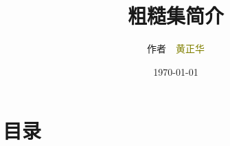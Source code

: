 \documentclass[notheorems,mathserif,table]{beamer}
\begin{document}
\newtheorem{theorem}{定理}
\newtheorem{definition}{定义}
\newtheorem{lemma}{引理}
\newtheorem{corollary}{推论}
\newtheorem{proposition}{性质}
\newtheorem{example}{例}
\newtheorem{remark}{注}

\renewcommand\figurename{\rm 图}
\renewcommand\tablename{\bf 表}
    \title{\heiti 粗糙集简介}
    \author[\textcolor{white}{\songti 作者~黄正华}]{\songti 作者~~\textcolor{olive}{黄正华}}
    \date{\today}
    \frame{ \titlepage }
    \section*{目录}
\end{document}
